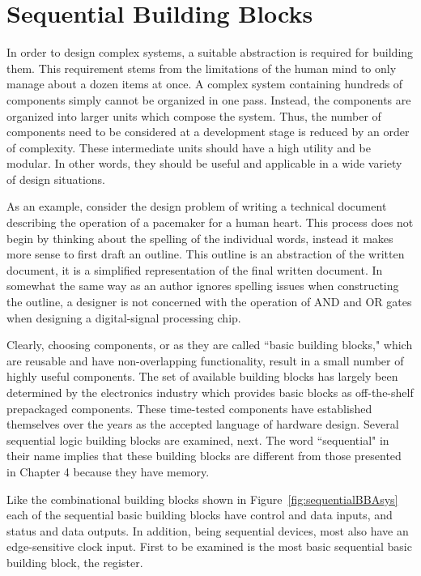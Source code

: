 \chapter{Sequential Building Blocks}
\label{chapter:Sequential Building Blocks}
\graphicspath{ {./chapter06/Fig} }

In order to design complex systems, a suitable 
abstraction is required for building them.  This requirement stems from the
limitations of the human mind to only manage about a dozen items
at once.  A complex system containing hundreds of components
simply cannot be organized in one pass.  Instead, the components 
are organized into larger units which compose the system. Thus, 
the number of components need to be considered at a development stage is reduced
by an order of complexity. These intermediate units should have
a high utility and be modular.  In other words, they should be
useful and applicable in a wide variety of design situations.

As an example, consider the design problem of writing a technical 
document describing the operation of a pacemaker for a human heart.
This process does not begin by thinking about the spelling of
the individual words, instead it makes more sense to first
draft an outline.  This outline is an abstraction of the 
written document, it is a simplified representation of the final 
written document.  In somewhat the same way as an author ignores
spelling issues when constructing the outline, a designer is not concerned with 
the operation of AND and OR gates
when designing a digital-signal processing chip.  

Clearly, choosing components, or as they are called ``basic 
building blocks," which are reusable and have non-overlapping
functionality, result in a small number of highly useful 
components.  The set of available building blocks has largely 
been determined by the electronics industry which provides basic
blocks as off-the-shelf prepackaged components.  These 
time-tested components have established themselves over the years 
as the accepted language of hardware design. 
Several sequential logic building blocks are examined, next.  
The word ``sequential" in their name implies that these building 
blocks are different from those presented in Chapter 4 because 
they have memory. 

Like the combinational building blocks shown in 
Figure~\ref{fig:sequentialBBAsys} each of the sequential basic building 
blocks have control and data inputs, and status and
data outputs.  In addition, being sequential devices, most
also have an edge-sensitive clock input.  First to be examined is 
the most basic sequential basic building block, the register.

